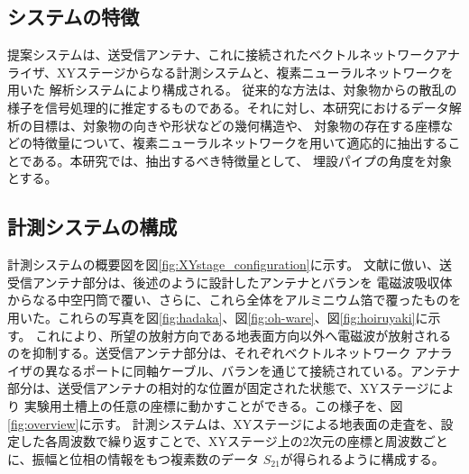 \documentclass[11pt,a4paper,uplatex]{ujarticle}
\begin{document}
  
  \subsection{システムの特徴}
    
    提案システムは、送受信アンテナ、これに接続されたベクトルネットワークアナライザ、XYステージからなる計測システムと、複素ニューラルネットワークを用いた
    解析システムにより構成される。
    従来的な方法は、対象物からの散乱の様子を信号処理的に推定するものである。それに対し、本研究におけるデータ解析の目標は、対象物の向きや形状などの幾何構造や、
    対象物の存在する座標などの特徴量について、複素ニューラルネットワークを用いて適応的に抽出することである。本研究では、抽出するべき特徴量として、
    埋設パイプの角度を対象とする。

  \subsection{計測システムの構成}

    計測システムの概要図を図\ref{fig:XYstage_configuration}に示す。
    文献\cite{absorbing_material}に倣い、送受信アンテナ部分は、後述のように設計したアンテナとバランを
    電磁波吸収体からなる中空円筒で覆い、さらに、これら全体をアルミニウム箔で覆ったものを用いた。これらの写真を図\ref{fig:hadaka}、図\ref{fig:oh-ware}、図\ref{fig:hoiruyaki}に示す。
    これにより、所望の放射方向である地表面方向以外へ電磁波が放射されるのを抑制する。送受信アンテナ部分は、それぞれベクトルネットワーク
    アナライザの異なるポートに同軸ケーブル、バランを通じて接続されている。アンテナ部分は、送受信アンテナの相対的な位置が固定された状態で、XYステージにより
    実験用土槽上の任意の座標に動かすことができる。この様子を、図\ref{fig:overview}に示す。
    計測システムは、XYステージによる地表面の走査を、設定した各周波数で繰り返すことで、XYステージ上の2次元の座標と周波数ごとに、振幅と位相の情報をもつ複素数のデータ
    $S_{21}$が得られるように構成する。
\end{document}
